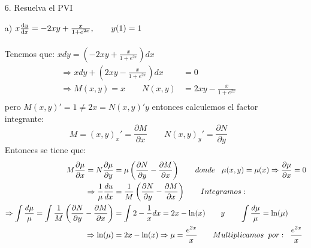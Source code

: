 \begin{enumerate}
    \item[6.] Resuelva el PVI
\end{enumerate}

\begin{itemize}
    \item[a)] $x\dv{y}{x} = -2xy+ \frac{x}{1+e^{2x}}, \qquad y(1)= 1$ \\ \\
    Tenemos que: $xdy=(-2xy+\frac{x}{1+e^{2x}})dx$\\
    \begin{align*}
        \Rightarrow xdy+\left(2xy - \frac{x}{1+e^{2x}}\right)dx &= 0\\
        \Rightarrow M(x,y)=x \qquad N(x,y) &= 2xy-\frac{x}{1+e^{2x}}\\
    \end{align*}
    pero $M(x,y)'=1\not= 2x=N(x,y)'y$ \qquad entonces calculemos el factor integrante:\\
    \begin{equation*}
        M=(x,y)_x'=\frac{\partial M}{\partial x} \qquad N(x,y)_y'=\frac{\partial N}{\partial y}
    \end{equation*}
    Entonces se tiene que:
    \begin{align*}
        M\frac{\partial \mu}{\partial x}=N\frac{\partial \mu}{\partial y} &= \mu \left(\frac{\partial N}{\partial y}-\frac{\partial M}{\partial x}\right) \qquad donde \hspace{0.3cm}\mu (x,y) =\mu (x) \Rightarrow \frac{\partial \mu}{\partial x}=0 \\
        \Rightarrow \frac{1}{\mu}\frac{du}{dx} &= \frac{1}{M}\left(\frac{\partial N}{\partial y}-\frac{\partial M}{\partial x}\right) \qquad Integramos: \\
        \Rightarrow\int \frac{d\mu}{\mu}=\int \frac{1}{M}\left(\frac{\partial N}{\partial y}-\frac{\partial M}{\partial x}\right) &= \int2-\frac{1}{x}dx = 2x-\ln(x) \qquad y \qquad\int \frac{d\mu}{\mu}=\ln(\mu) \\
        \Rightarrow \ln(\mu) &= 2x-\ln(x) \Rightarrow \mu=\frac{e^{2x}}{x} \qquad Multiplicamos \hspace{0.2cm} por:  \hspace{0.2cm} \frac{e^{2x}}{x} \\

\end{align*}
\end{itemize}
